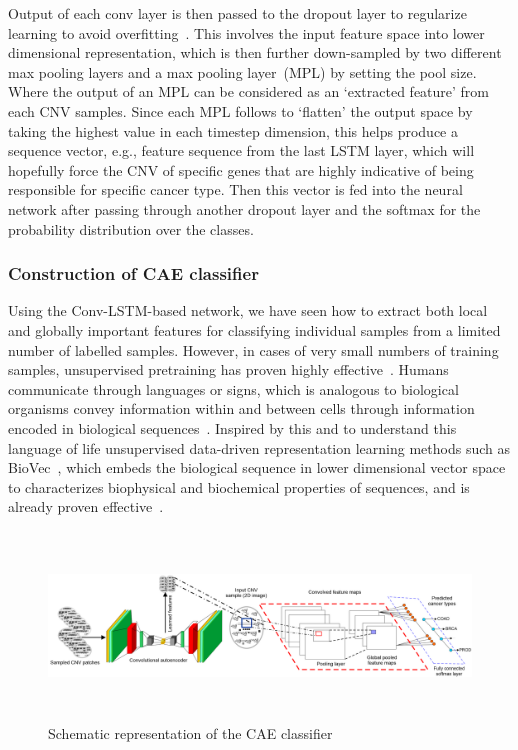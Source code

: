 \hspace*{3.5mm} Output of each conv layer is then passed to the dropout layer to regularize learning to avoid overfitting~\cite{vardropout}. This involves the input feature space into lower dimensional representation, which is then further down-sampled by two different max pooling layers and a max pooling layer~(MPL) by setting the pool size. Where the output of an MPL can be considered as an `extracted feature' from each CNV samples. Since each MPL follows to `flatten' the output space by taking the highest value in each timestep dimension, this helps produce a sequence vector, e.g., feature sequence from the last LSTM layer, which will hopefully force the CNV of specific genes that are highly indicative of being responsible for specific cancer type. Then this vector is fed into the neural network after passing through another dropout layer and the softmax for the probability distribution over the classes. 

\subsubsection{Construction of CAE classifier}
Using the Conv-LSTM-based network, we have seen how to extract both local and globally important features for classifying individual samples from a limited number of labelled samples. However, in cases of very small numbers of training samples, unsupervised pretraining has proven highly effective~\cite{ae1,ae2,ae3}. 
Humans communicate through languages or signs, which is analogous to biological organisms convey information within and between cells through information encoded in biological sequences~\cite{yue2018deep}. Inspired by this and to understand this language of life unsupervised data-driven representation learning methods such as BioVec~\cite{asgari2015continuous}, which embeds the biological sequence in lower dimensional vector space to characterizes biophysical and biochemical properties of sequences, and is already proven effective~\cite{yue2018deep}.

\begin{figure}[h]
	\centering
	\includegraphics[width=\textwidth,height=50mm]{images/cae.png}	
    \caption{Schematic representation of the CAE classifier~\cite{karimACCA2019}}
	\label{fig:cae}
\end{figure}


